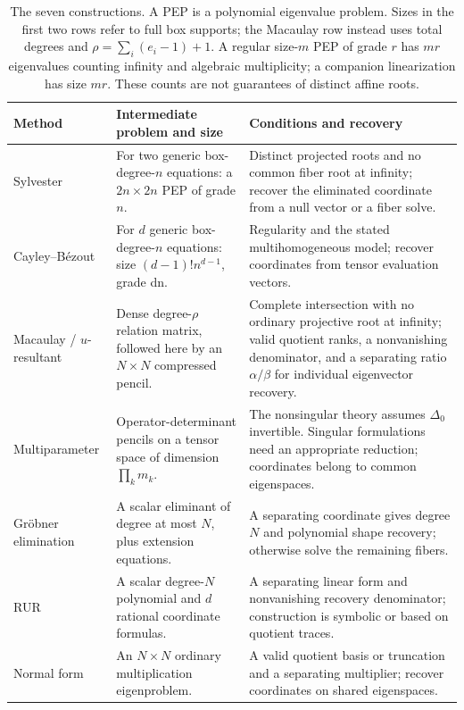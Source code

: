 \documentclass[12pt]{article}
\theoremstyle{definition}
\theoremstyle{remark}
\begin{document}
\begin{table}[htbp]
\centering\small
\begin{tabularx}{\textwidth}{@{}>{\raggedright\arraybackslash}p{}XX@{}}
\toprule
Method & Intermediate problem and size & Conditions and recovery \\
\midrule
Sylvester & For two generic box-degree-$n$ equations: a $2n\times2n$ PEP of grade $n$.
 & Distinct projected roots and no common fiber root at infinity; recover the
 eliminated coordinate from a null vector or a fiber solve. \\[0.5em]
Cayley--B\'ezout & For $d$ generic box-degree-$n$ equations: size
 $(d-1)!n^{d-1}$, grade dn.
 & Regularity and the stated multihomogeneous model; recover coordinates from
 tensor evaluation vectors. \\[0.5em]
Macaulay / $u$-resultant & Dense degree-$\rho$ relation matrix, followed here by
 an $N\times N$ compressed pencil.
 & Complete intersection with no ordinary projective root at infinity; valid
 quotient ranks, a nonvanishing denominator, and a separating ratio
 $\alpha/\beta$ for individual eigenvector recovery. \\[0.5em]
Multiparameter & Operator-determinant pencils on a tensor space of dimension
 $\prod_k m_k$.
 & The nonsingular theory assumes $\Delta_0$ invertible. Singular formulations
 need an appropriate reduction; coordinates belong to common eigenspaces. \\[0.5em]
Gr\"obner elimination & A scalar eliminant of degree at most $N$, plus extension
 equations.
 & A separating coordinate gives degree $N$ and polynomial shape recovery;
 otherwise solve the remaining fibers. \\[0.5em]
RUR & A scalar degree-$N$ polynomial and $d$ rational coordinate formulas.
 & A separating linear form and nonvanishing recovery denominator; construction
 is symbolic or based on quotient traces. \\[0.5em]
Normal form & An $N\times N$ ordinary multiplication eigenproblem.
 & A valid quotient basis or truncation and a separating multiplier; recover
 coordinates on shared eigenspaces. \\
\bottomrule
\end{tabularx}
\caption{The seven constructions. A PEP is a polynomial eigenvalue problem.
Sizes in the first two rows refer to full box supports; the Macaulay row instead
uses total degrees and $\rho=\sum_i(e_i-1)+1$. A regular size-$m$ PEP of grade $r$
has $mr$ eigenvalues counting infinity and algebraic multiplicity; a companion
linearization has size $mr$. These counts are not guarantees of distinct affine roots.}
\label{tab:methods}
\end{table}
\end{document}
